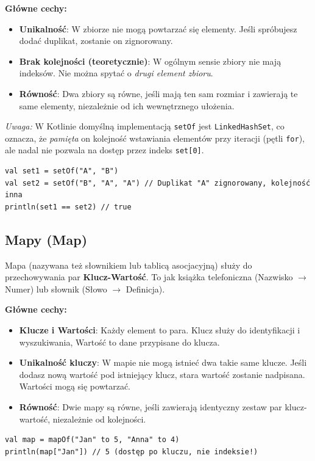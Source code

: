 \textbf{Główne cechy:}
\begin{itemize}
    \item \textbf{Unikalność}: W zbiorze nie mogą powtarzać się elementy. Jeśli spróbujesz dodać duplikat, zostanie on zignorowany.
    \item \textbf{Brak kolejności (teoretycznie)}: W ogólnym sensie zbiory nie mają indeksów. Nie można spytać o \textit{drugi element zbioru}.
    \item \textbf{Równość}: Dwa zbiory są równe, jeśli mają ten sam rozmiar i zawierają te same elementy, niezależnie od ich wewnętrznego ułożenia.
\end{itemize}

\textit{Uwaga:} W Kotlinie domyślną implementacją \texttt{setOf} jest \texttt{LinkedHashSet}, co oznacza, że \textit{pamięta} on kolejność wstawiania elementów przy iteracji (pętli \texttt{for}), ale nadal nie pozwala na dostęp przez indeks \texttt{set[0]}.

\begin{verbatim}
val set1 = setOf("A", "B")
val set2 = setOf("B", "A", "A") // Duplikat "A" zignorowany, kolejność inna
println(set1 == set2) // true
\end{verbatim}

\subsection{Mapy (Map)}
Mapa (nazywana też słownikiem lub tablicą asocjacyjną) służy do przechowywania par \textbf{Klucz-Wartość}. To jak książka telefoniczna (Nazwisko $\rightarrow$ Numer) lub słownik (Słowo $\rightarrow$ Definicja).

\textbf{Główne cechy:}
\begin{itemize}
    \item \textbf{Klucze i Wartości}: Każdy element to para. Klucz służy do identyfikacji i wyszukiwania, Wartość to dane przypisane do klucza.
    \item \textbf{Unikalność kluczy}: W mapie nie mogą istnieć dwa takie same klucze. Jeśli dodasz nową wartość pod istniejący klucz, stara wartość zostanie nadpisana. Wartości mogą się powtarzać.
    \item \textbf{Równość}: Dwie mapy są równe, jeśli zawierają identyczny zestaw par klucz-wartość, niezależnie od kolejności.
\end{itemize}

\begin{verbatim}
val map = mapOf("Jan" to 5, "Anna" to 4)
println(map["Jan"]) // 5 (dostęp po kluczu, nie indeksie!)
\end{verbatim}

